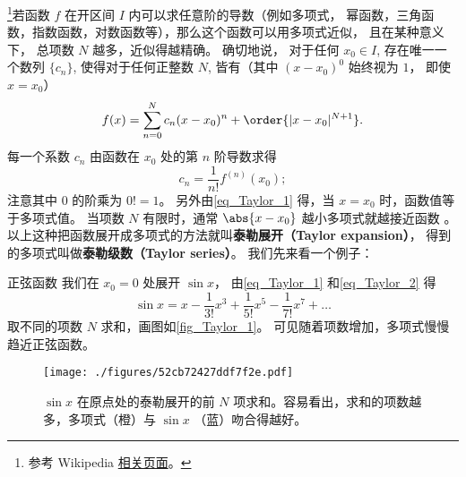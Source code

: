 

\footnote{参考 Wikipedia \href{https://en.wikipedia.org/wiki/Taylor's_theorem}{相关页面}。}若函数 $f$ 在开区间 $I$ 内可以求任意阶的导数（例如多项式， 幂函数，三角函数，指数函数，对数函数等），那么这个函数可以用多项式近似， 且在某种意义下， 总项数 $N$ 越多，近似得越精确。 确切地说， 对于任何 $x_0\in I$, 存在唯一一个数列 $\{c_n\}$, 使得对于任何正整数 $N$, 皆有（其中 $(x-x_0)^0$ 始终视为 $1$， 即使 $x = x_0$）
\begin{equation}\label{eq_Taylor_1}
f(x) = \sum_{n = 0}^N  c_n (x - x_0)^n + \order{|x-x_0|^{N+1}}.
\end{equation}
每一个系数 $c_n$ 由函数在 $x_0$ 处的第 $n$ 阶导数求得
\begin{equation}\label{eq_Taylor_2}
c_n = \frac{1}{n!} f^{(n)}(x_0);
\end{equation}
注意其中 0 的阶乘为 $0! = 1$。 另外由\autoref{eq_Taylor_1} 得，当 $x=x_0$ 时，函数值等于多项式值。 当项数 $N$ 有限时，通常 $\abs{x-x_0}$ 越小多项式就越接近函数 。 以上这种把函数展开成多项式的方法就叫\textbf{泰勒展开（Taylor expansion）}， 得到的多项式叫做\textbf{泰勒级数（Taylor series）}。 我们先来看一个例子：

\begin{example}{正弦函数}
我们在 $x_0=0$ 处展开 $\sin x$， 由\autoref{eq_Taylor_1} 和\autoref{eq_Taylor_2} 得
\begin{equation}\label{eq_Taylor_3}
\sin x = x - \frac{1}{3!}{x^3} + \frac{1}{5!}{x^5} - \frac{1}{7!} x^7 + \ldots 
\end{equation}
取不同的项数 $N$ 求和，画图如\autoref{fig_Taylor_1}。 可见随着项数增加，多项式慢慢趋近正弦函数。

\begin{figure}[ht]
\centering
\texttt{[image: ./figures/52cb72427ddf7f2e.pdf]}
\caption{$\sin x$ 在原点处的泰勒展开的前 $N$ 项求和。容易看出，求和的项数越多，多项式（橙）与 $\sin x$ （蓝）吻合得越好。}\label{fig_Taylor_1}
\end{figure}
\end{example}

